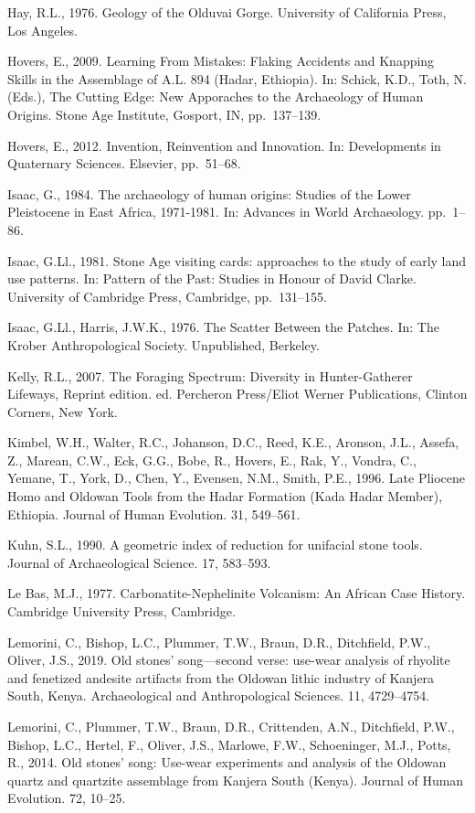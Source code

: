 \documentclass[]{elsarticle} %
\begin{document}
Hay, R.L., 1976. Geology of the Olduvai Gorge. University of California
Press, Los Angeles.

Hovers, E., 2009. Learning From Mistakes: Flaking Accidents and Knapping
Skills in the Assemblage of A.L. 894 (Hadar, Ethiopia). In: Schick,
K.D., Toth, N. (Eds.), The Cutting Edge: New Apporaches to the
Archaeology of Human Origins. Stone Age Institute, Gosport, IN,
pp.~137--139.

Hovers, E., 2012. Invention, Reinvention and Innovation. In:
Developments in Quaternary Sciences. Elsevier, pp.~51--68.

Isaac, G., 1984. The archaeology of human origins: Studies of the Lower
Pleistocene in East Africa, 1971-1981. In: Advances in World
Archaeology. pp.~1--86.

Isaac, G.Ll., 1981. Stone Age visiting cards: approaches to the study of
early land use patterns. In: Pattern of the Past: Studies in Honour of
David Clarke. University of Cambridge Press, Cambridge, pp.~131--155.

Isaac, G.Ll., Harris, J.W.K., 1976. The Scatter Between the Patches. In:
The Krober Anthropological Society. Unpublished, Berkeley.

Kelly, R.L., 2007. The Foraging Spectrum: Diversity in Hunter-Gatherer
Lifeways, Reprint edition. ed. Percheron Press/Eliot Werner
Publications, Clinton Corners, New York.

Kimbel, W.H., Walter, R.C., Johanson, D.C., Reed, K.E., Aronson, J.L.,
Assefa, Z., Marean, C.W., Eck, G.G., Bobe, R., Hovers, E., Rak, Y.,
Vondra, C., Yemane, T., York, D., Chen, Y., Evensen, N.M., Smith, P.E.,
1996. Late Pliocene Homo and Oldowan Tools from the Hadar Formation
(Kada Hadar Member), Ethiopia. Journal of Human Evolution. 31, 549--561.

Kuhn, S.L., 1990. A geometric index of reduction for unifacial stone
tools. Journal of Archaeological Science. 17, 583--593.

Le Bas, M.J., 1977. Carbonatite-Nephelinite Volcanism: An African Case
History. Cambridge University Press, Cambridge.

Lemorini, C., Bishop, L.C., Plummer, T.W., Braun, D.R., Ditchfield,
P.W., Oliver, J.S., 2019. Old stones' song---second verse: use-wear
analysis of rhyolite and fenetized andesite artifacts from the Oldowan
lithic industry of Kanjera South, Kenya. Archaeological and
Anthropological Sciences. 11, 4729--4754.

Lemorini, C., Plummer, T.W., Braun, D.R., Crittenden, A.N., Ditchfield,
P.W., Bishop, L.C., Hertel, F., Oliver, J.S., Marlowe, F.W.,
Schoeninger, M.J., Potts, R., 2014. Old stones' song: Use-wear
experiments and analysis of the Oldowan quartz and quartzite assemblage
from Kanjera South (Kenya). Journal of Human Evolution. 72, 10--25.
\end{document}
